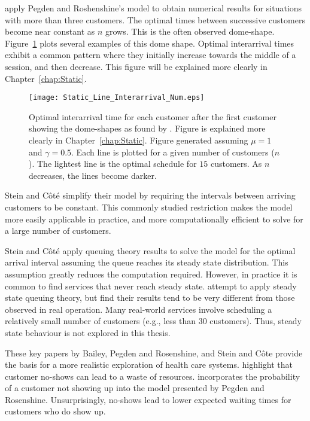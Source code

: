 \citet{Stein} apply Pegden and Roshenshine's model to obtain numerical results for situations with more than three customers. The optimal times between successive customers become near constant as $n$ grows. This is the often observed dome-shape. Figure~\ref{fig:Lit_Dome_Shape} plots several examples of this dome shape. Optimal interarrival times exhibit a common pattern where they initially increase towards the middle of a session, and then decrease. This figure will be explained more clearly in Chapter~\ref{chap:Static}.
\begin{figure}[htb]
	\centering
	\texttt{[image: Static\_Line\_Interarrival\_Num.eps]}
	\caption{Optimal interarrival time for each customer after the first customer showing the dome-shapes as found by \citet{Stein}. Figure is explained more clearly in Chapter~\ref{chap:Static}. Figure generated assuming $\mu = 1$ and $\gamma = 0.5$. Each line is plotted for a given number of customers ($n$). The lightest line is the optimal schedule for $15$ customers. As $n$ decreases, the lines become darker.}
	\label{fig:Lit_Dome_Shape}
\end{figure}

Stein and C\^{o}t\'{e} simplify their model by requiring the intervals between arriving customers to be constant. This commonly studied restriction makes the model more easily applicable in practice, and more computationally efficient to solve for a large number of customers.

Stein and C\^{o}t\'{e} apply queuing theory results to solve the model for the optimal arrival interval assuming the queue reaches its steady state distribution. This assumption greatly reduces the computation required. However, in practice it is common to find services that never reach steady state. \citet{Babes} attempt to apply steady state queuing theory, but find their results tend to be very different from those observed in real operation. Many real-world services involve scheduling a relatively small number of customers (e.g., less than 30 customers). Thus, steady state behaviour is not explored in this thesis.

These key papers by Bailey, Pegden and Rosenshine, and Stein and C\^{o}te provide the basis for a more realistic exploration of health care systems. \citet{Delaurentis} highlight that customer no-shows can lead to a waste of resources. \citet{Mendel} incorporates the probability of a customer not showing up into the model presented by Pegden and Rosenshine. Unsurprisingly, no-shows lead to lower expected waiting times for customers who do show up.

